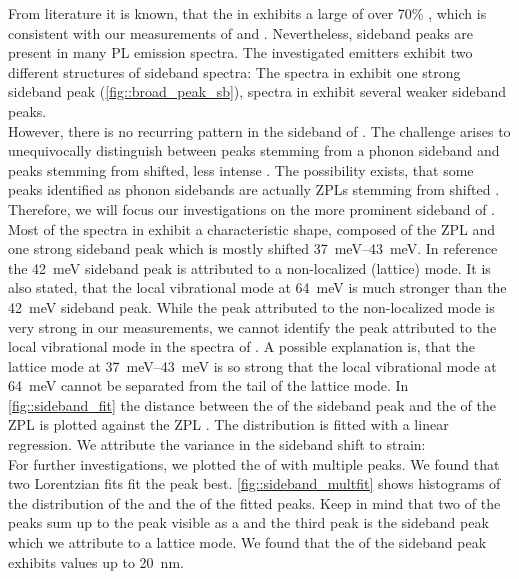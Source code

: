 		From literature it is known, that the \siv in \nd exhibits a large \db of over 70\% \cite{Neu2011,Neu2011b}, which is consistent with our measurements of \emnarrow and \embroad.
		Nevertheless, sideband peaks are present in many \siv PL emission spectra.
		The investigated emitters exhibit two different structures of sideband spectra: The spectra in \gv exhibit one strong sideband peak (\autoref{fig::broad_peak_sb}), spectra in \gh exhibit several weaker sideband peaks.
		\\
		However, there is no recurring pattern in the sideband of \gh.
		The challenge arises to unequivocally distinguish between peaks stemming from a phonon sideband and peaks stemming from shifted, less intense \siv \ZPLs.
		The possibility exists, that some peaks identified as phonon sidebands are actually ZPLs stemming from shifted \sivs. 
		Therefore, we will focus our investigations on the more prominent sideband of \gv.
		\\
		Most of the spectra in \gv exhibit a characteristic shape, composed of the ZPL and one strong sideband peak which is mostly shifted \SIrange{37}{43}{meV}. 
		In reference \cite{Dietrich2014} the \SI{42}{meV} sideband peak is attributed to a non-localized (lattice) mode. 
		It is also stated, that the local vibrational mode at \SI{64}{meV} is much stronger than the  \SI{42}{meV} sideband peak. 
		While the peak attributed to the non-localized mode is very strong in our measurements, we cannot identify the peak attributed to the local vibrational \siv mode in the spectra of \gv. 
		A possible explanation is, that the lattice mode at \SIrange{37}{43}{meV} is so strong that the local vibrational mode at \SI{64}{meV} cannot be separated from the tail of the lattice mode.
		In \autoref{fig::sideband_fit} the distance between the \cwl of the sideband peak and the \cwl of the ZPL is plotted against the ZPL \cwl. 
		The distribution is fitted with a linear regression.
		We attribute the variance in the sideband shift to strain: 
		\\
		For further investigations, we plotted the \ZPL  of \gv with multiple peaks. 
		We found that two Lorentzian fits fit the peak best.
		\autoref{fig::sideband_multfit} shows histograms of the distribution of the \cw and the \lw of the fitted peaks.
		Keep in mind that two of the peaks sum up to the peak visible as a \ZPL and the third peak is the sideband peak which we attribute to a lattice mode.
		We found that the \lw of the sideband peak exhibits values up to \SI{20}{nm}.
